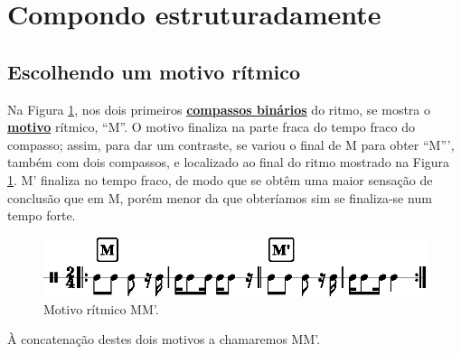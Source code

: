
\section{Compondo estruturadamente}
\label{sec:compondoestruturadamente}


\subsection{Escolhendo um motivo rítmico}
Na Figura \ref{fig:motivoritmico1}, 
nos  dois  primeiros \hyperref[subsec:compassobinario]{\textbf{compassos binários}} do ritmo,
 se mostra o  \hyperref[sec:Motivo]{\textbf{motivo}} rítmico, ``M''. 
O motivo finaliza na parte fraca do tempo fraco do compasso; assim,
para dar um contraste, se variou o final de M para obter ``M''', 
também com dois compassos, e localizado ao final do ritmo mostrado na Figura \ref{fig:motivoritmico1}. 
M' finaliza no tempo fraco, de modo que se obtêm uma maior sensação de conclusão que em M, 
porém menor da que obteríamos sim se finaliza-se num tempo forte.
\begin{figure}[H]
     \centering
     \includegraphics[width=\textwidth]{chapters/cap-musica-topicos/motivo-ritmico-1.eps}
     \caption{Motivo rítmico MM'.}
     \label{fig:motivoritmico1}
\end{figure}
À concatenação destes dois motivos a chamaremos MM'.


